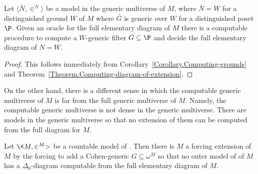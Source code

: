 \documentclass{amsart}
\begin{document}
\begin{corollary}\label{Corollary.Computing-the-generic-multiverse}
Let $\langle\bar N,\in^{\bar N}\rangle$ be a model in the generic multiverse of $M$, where $\bar N = W$ for a distinguished ground $W$ of $M$ where $\bar G$ is generic over $W$ for a distinguished poset $\P$. Given an oracle for the full elementary diagram of $M$ there is a computable procedure to compute a $W$-generic filter $G \subseteq \P$ and decide the full elementary diagram of $N = W$.
\end{corollary}
\begin{proof}
This follows immediately from Corollary~\ref{Corollary.Computing-grounds} and Theorem~\ref{Theorem.Computing-diagram-of-extension}.
\end{proof}
On the other hand, there is a different sense in which the computable generic multiverse of $M$ is far from the full generic multiverse of $M$. Namely, the computable generic multiverse is not dense in the generic multiverse. There are models in the generic multiverse so that no extension of them can be computed from the full diagram for $M$.
\begin{theorem}
Let $\<M,\in^M>$ be a countable model of \ZF. Then there is $M$ a forcing extension of $M$ by the forcing to add a Cohen-generic $G \subseteq \omega^M$ so that no outer model of of $M$ has a $\Delta_0$-diagram computable from the full elementary diagram of $M$.
\end{theorem}
\end{document}
